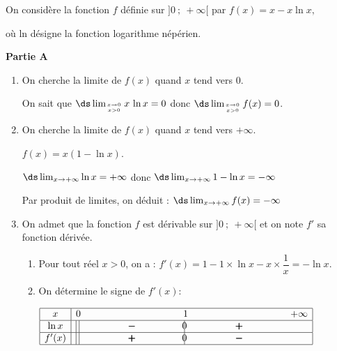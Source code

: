 
%

\medskip

On considère la fonction $f$  définie sur $]0~;~+\infty[$ par 
$f(x) = x - x \ln x,$

où ln désigne la fonction logarithme népérien.

\bigskip

\textbf{Partie A}

\medskip

\begin{enumerate}
\item On cherche la limite de $f(x)$ quand $x$ tend vers $0$.

On sait que $\ds\lim_{x\to 0 \atop x>0} x\,\ln x=0$ donc $\ds\lim_{x\to 0 \atop x>0} f(x) = 0$.

\item On cherche la limite de $f(x)$ quand $x$ tend vers $+\infty$.

$f(x)=x\left (1 - \ln x\right )$.

$\ds\lim_{x\to +\infty} \ln x = +\infty$ donc $\ds\lim_{x\to +\infty} 1- \ln x = -\infty$

Par produit de limites, on déduit : $\ds\lim_{x\to +\infty} f(x) = -\infty$

\item On admet que la fonction $f$ est dérivable sur $]0~;~+\infty[$ et on note $f'$ sa fonction dérivée.
	\begin{enumerate}
		\item Pour tout réel $x > 0$, on a :
		$f'(x) = 1 - 1\times \ln x - x\times \dfrac{1}{x} = - \ln x$.
		
		\item %
		
On détermine le signe de $f'(x)$:

\begin{center}
{\renewcommand{\arraystretch}{1.5}
\def\esp{\hspace*{3cm}}
$\begin{array}{|c |l *{4}{c} |} 
\hline
x  & 0 & \esp & 1 & \esp  & +\infty \\
\hline
\ln x &\vline\;\vline  & \pmb{-} &  \vline\hspace{-2.7pt}{0} & \pmb{+} &   \\
\hline
f'(x) &\vline\;\vline  & \pmb{+} &  \vline\hspace{-2.7pt}{0} & \pmb{-} &   \\
\hline
\end{array}$
}
\end{center}
		

\end{enumerate}
\end{enumerate}
